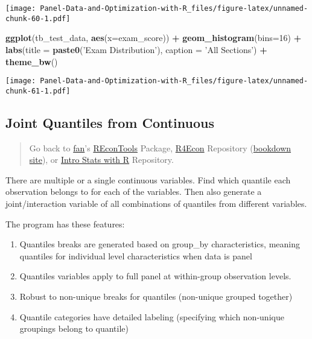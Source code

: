 \documentclass[
]{book}
\newenvironment{Shaded}{\begin{snugshade}}{\end{snugshade}}
\newcommand{\DataTypeTok}[1]{\textcolor[rgb]{0.13,0.29,0.53}{#1}}
\newcommand{\DecValTok}[1]{\textcolor[rgb]{0.00,0.00,0.81}{#1}}
\newcommand{\KeywordTok}[1]{\textcolor[rgb]{0.13,0.29,0.53}{\textbf{#1}}}
\newcommand{\NormalTok}[1]{#1}
\newcommand{\OperatorTok}[1]{\textcolor[rgb]{0.81,0.36,0.00}{\textbf{#1}}}
\newcommand{\StringTok}[1]{\textcolor[rgb]{0.31,0.60,0.02}{#1}}
\providecommand{\tightlist}{%
  \setlength{\itemsep}{0pt}\setlength{\parskip}{0pt}}
\begin{document}
\texttt{[image: Panel-Data-and-Optimization-with-R\_files/figure-latex/unnamed-chunk-60-1.pdf]}

\begin{Shaded}
\begin{Highlighting}[]
\KeywordTok{ggplot}\NormalTok{(tb_test_data, }\KeywordTok{aes}\NormalTok{(}\DataTypeTok{x=}\NormalTok{exam_score)) }\OperatorTok{+}
\StringTok{  }\KeywordTok{geom_histogram}\NormalTok{(}\DataTypeTok{bins=}\DecValTok{16}\NormalTok{) }\OperatorTok{+}
\StringTok{  }\KeywordTok{labs}\NormalTok{(}\DataTypeTok{title =} \KeywordTok{paste0}\NormalTok{(}\StringTok{'Exam Distribution'}\NormalTok{),}
       \DataTypeTok{caption =} \StringTok{'All Sections'}\NormalTok{) }\OperatorTok{+}
\StringTok{  }\KeywordTok{theme_bw}\NormalTok{()}
\end{Highlighting}
\end{Shaded}

\texttt{[image: Panel-Data-and-Optimization-with-R\_files/figure-latex/unnamed-chunk-61-1.pdf]}

\hypertarget{joint-quantiles-from-continuous}{%
\subsection{Joint Quantiles from Continuous}\label{joint-quantiles-from-continuous}}

\begin{quote}
Go back to \href{http://fanwangecon.github.io/CodeDynaAsset/}{fan}'s \href{https://fanwangecon.github.io/REconTools/}{REconTools} Package, \href{https://fanwangecon.github.io/R4Econ/}{R4Econ} Repository (\href{https://fanwangecon.github.io/R4Econ/bookdown}{bookdown site}), or \href{https://fanwangecon.github.io/Stat4Econ/}{Intro Stats with R} Repository.
\end{quote}

There are multiple or a single continuous variables. Find which quantile each observation belongs to for each of the variables. Then also generate a joint/interaction variable of all combinations of quantiles from different variables.

The program has these features:

\begin{enumerate}
\def\labelenumi{\arabic{enumi}.}
\tightlist
\item
  Quantiles breaks are generated based on group\_by characteristics, meaning quantiles for individual level characteristics when data is panel
\item
  Quantiles variables apply to full panel at within-group observation levels.
\item
  Robust to non-unique breaks for quantiles (non-unique grouped together)
\item
  Quantile categories have detailed labeling (specifying which non-unique groupings belong to quantile)
\end{enumerate}
\end{document}
